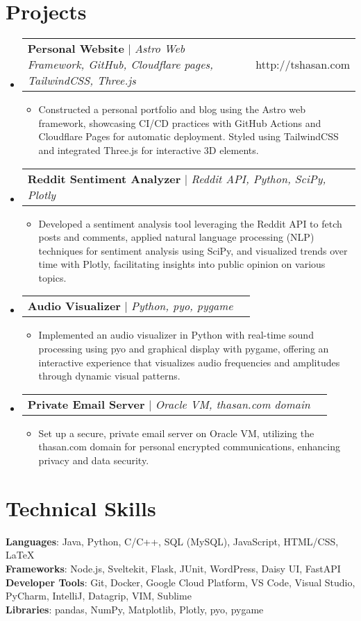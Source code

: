 \documentclass[letterpaper,11pt]{article}
\makeatletter
\newcommand{\resumeItem}[1]{
  \item\small{
    {#1 \vspace{-2pt}}
  }
}
\newcommand{\resumeProjectHeading}[2]{
    \item
    \begin{tabular*}{0.97\textwidth}{l@{\extracolsep{\fill}}r}
      \small#1 & #2 \\
    \end{tabular*}\vspace{-7pt}
}
\newcommand{\resumeSubHeadingListStart}{\begin{itemize}[leftmargin=0.15in, label={}]}
\newcommand{\resumeSubHeadingListEnd}{\end{itemize}}
\newcommand{\resumeItemListStart}{\begin{itemize}}
\newcommand{\resumeItemListEnd}{\end{itemize}\vspace{-5pt}}
\makeatother
\begin{document}
\section{Projects}
    \resumeSubHeadingListStart
      \resumeProjectHeading
          {\textbf{Personal Website} $|$ \emph{Astro Web Framework, GitHub, Cloudflare pages, TailwindCSS, Three.js}}{http://tshasan.com}
          \resumeItemListStart
            \resumeItem{Constructed a personal portfolio and blog using the Astro web framework, showcasing CI/CD practices with GitHub Actions and Cloudflare Pages for automatic deployment. Styled using TailwindCSS and integrated Three.js for interactive 3D elements.}
          \resumeItemListEnd
      \resumeProjectHeading
          {\textbf{Reddit Sentiment Analyzer} $|$ \emph{Reddit API, Python, SciPy, Plotly}}{}
          \resumeItemListStart
            \resumeItem{Developed a sentiment analysis tool leveraging the Reddit API to fetch posts and comments, applied natural language processing (NLP) techniques for sentiment analysis using SciPy, and visualized trends over time with Plotly, facilitating insights into public opinion on various topics.}
          \resumeItemListEnd
      \resumeProjectHeading
          {\textbf{Audio Visualizer} $|$ \emph{Python, pyo, pygame}}{}
          \resumeItemListStart
            \resumeItem{Implemented an audio visualizer in Python with real-time sound processing using pyo and graphical display with pygame, offering an interactive experience that visualizes audio frequencies and amplitudes through dynamic visual patterns.}
          \resumeItemListEnd
      \resumeProjectHeading
          {\textbf{Private Email Server} $|$ \emph{Oracle VM, thasan.com domain}}{}
          \resumeItemListStart
            \resumeItem{Set up a secure, private email server on Oracle VM, utilizing the thasan.com domain for personal encrypted communications, enhancing privacy and data security.}
          \resumeItemListEnd
    \resumeSubHeadingListEnd


\section{Technical Skills}
 \begin{itemize}[leftmargin=0.15in, label={}]
    \small{\item{
     \textbf{Languages}{: Java, Python, C/C++, SQL (MySQL), JavaScript, HTML/CSS, LaTeX} \\
     \textbf{Frameworks}{: Node.js, Sveltekit, Flask, JUnit, WordPress, Daisy UI, FastAPI} \\
     \textbf{Developer Tools}{: Git, Docker, Google Cloud Platform, VS Code, Visual Studio, PyCharm, IntelliJ, Datagrip, VIM, Sublime} \\
     \textbf{Libraries}{: pandas, NumPy, Matplotlib, Plotly, pyo, pygame}
    }}
 \end{itemize}
\end{document}
